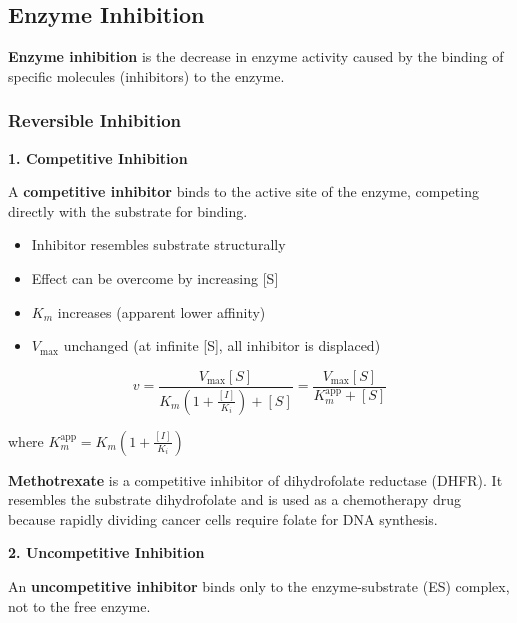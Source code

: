 \subsection{Enzyme Inhibition}

\begin{definition}
\textbf{Enzyme inhibition} is the decrease in enzyme activity caused by the binding of specific molecules (inhibitors) to the enzyme.
\end{definition}

\subsubsection{Reversible Inhibition}

\textbf{1. Competitive Inhibition}

\begin{definition}
A \textbf{competitive inhibitor} binds to the active site of the enzyme, competing directly with the substrate for binding.
\end{definition}

\begin{itemize}
    \item Inhibitor resembles substrate structurally
    \item Effect can be overcome by increasing [S]
    \item $K_m$ increases (apparent lower affinity)
    \item $V_{\max}$ unchanged (at infinite [S], all inhibitor is displaced)
\end{itemize}

\[
v = \frac{V_{\max}[S]}{K_m\left(1 + \frac{[I]}{K_i}\right) + [S]} = \frac{V_{\max}[S]}{K_m^{\text{app}} + [S]}
\]

where $K_m^{\text{app}} = K_m\left(1 + \frac{[I]}{K_i}\right)$

\begin{example}
\textbf{Methotrexate} is a competitive inhibitor of dihydrofolate reductase (DHFR). It resembles the substrate dihydrofolate and is used as a chemotherapy drug because rapidly dividing cancer cells require folate for DNA synthesis.
\end{example}

\textbf{2. Uncompetitive Inhibition}

\begin{definition}
An \textbf{uncompetitive inhibitor} binds only to the enzyme-substrate (ES) complex, not to the free enzyme.
\end{definition}

